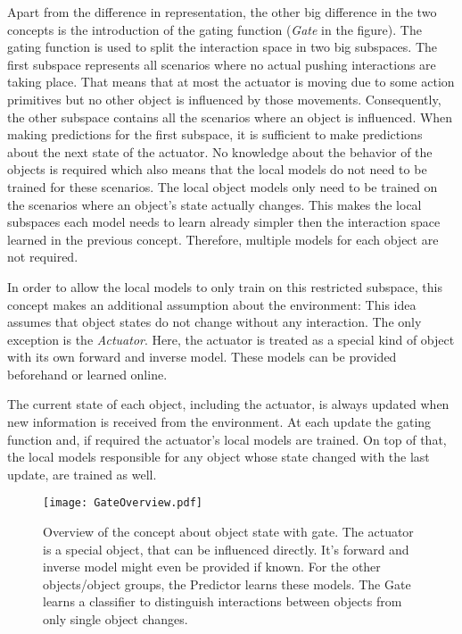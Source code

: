 Apart from the difference in representation, the other big difference in the two concepts is the introduction of the gating function (\textit{Gate} in the figure). The gating function is used to split the interaction space in two big subspaces. The first subspace represents all scenarios where no actual pushing interactions are taking place. That means that at most the actuator is moving due to some action primitives but no other object is influenced by those movements. Consequently, the other subspace contains all the scenarios where an object is influenced. When making predictions for the first subspace, it is sufficient to make predictions about the next state of the actuator. No knowledge about the behavior of the objects is required which also means that the local models do not need to be trained for these scenarios. The local object models only need to be trained on the scenarios where an object's state actually changes. 
This makes the local subspaces each model needs to learn already simpler then the interaction space learned in the previous concept. Therefore, multiple models for each object are not required.

In order to allow the local models to only train on this restricted subspace, this concept makes an additional assumption about the environment: 
This idea assumes that object states do not change without any interaction. The only exception is the \textit{Actuator}. Here, the actuator is treated as a special kind of object with its own forward and inverse model. These models can be provided beforehand or learned online.  

The current state of each object, including the actuator, is always updated when new information is received from the environment. At each update the gating function and, if required the actuator's local models are trained. On top of that, the local models responsible for any object whose state changed with the last update, are trained as well.


\begin{figure}
	\centering
	\texttt{[image: GateOverview.pdf]}
	\caption{Overview of the concept about object state with gate. The actuator is a special object, that can be influenced directly. It's forward and inverse model might even be provided if known. For the other objects/object groups, the Predictor learns these models. The Gate learns a classifier to distinguish interactions between objects from only single object changes.} 
	\label{fig:GateOverview}
\end{figure}


